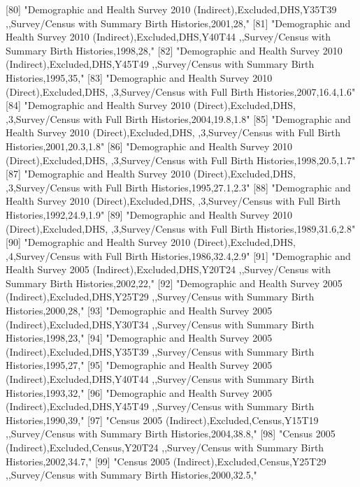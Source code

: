  [80] "Demographic and Health Survey 2010 (Indirect),Excluded,DHS,Y35T39 ,,Survey/Census with Summary Birth Histories,2001,28,"      
 [81] "Demographic and Health Survey 2010 (Indirect),Excluded,DHS,Y40T44 ,,Survey/Census with Summary Birth Histories,1998,28,"      
 [82] "Demographic and Health Survey 2010 (Indirect),Excluded,DHS,Y45T49 ,,Survey/Census with Summary Birth Histories,1995,35,"      
 [83] "Demographic and Health Survey 2010 (Direct),Excluded,DHS, ,3,Survey/Census with Full Birth Histories,2007,16.4,1.6"           
 [84] "Demographic and Health Survey 2010 (Direct),Excluded,DHS, ,3,Survey/Census with Full Birth Histories,2004,19.8,1.8"           
 [85] "Demographic and Health Survey 2010 (Direct),Excluded,DHS, ,3,Survey/Census with Full Birth Histories,2001,20.3,1.8"           
 [86] "Demographic and Health Survey 2010 (Direct),Excluded,DHS, ,3,Survey/Census with Full Birth Histories,1998,20.5,1.7"           
 [87] "Demographic and Health Survey 2010 (Direct),Excluded,DHS, ,3,Survey/Census with Full Birth Histories,1995,27.1,2.3"           
 [88] "Demographic and Health Survey 2010 (Direct),Excluded,DHS, ,3,Survey/Census with Full Birth Histories,1992,24.9,1.9"           
 [89] "Demographic and Health Survey 2010 (Direct),Excluded,DHS, ,3,Survey/Census with Full Birth Histories,1989,31.6,2.8"           
 [90] "Demographic and Health Survey 2010 (Direct),Excluded,DHS, ,4,Survey/Census with Full Birth Histories,1986,32.4,2.9"           
 [91] "Demographic and Health Survey 2005 (Indirect),Excluded,DHS,Y20T24 ,,Survey/Census with Summary Birth Histories,2002,22,"      
 [92] "Demographic and Health Survey 2005 (Indirect),Excluded,DHS,Y25T29 ,,Survey/Census with Summary Birth Histories,2000,28,"      
 [93] "Demographic and Health Survey 2005 (Indirect),Excluded,DHS,Y30T34 ,,Survey/Census with Summary Birth Histories,1998,23,"      
 [94] "Demographic and Health Survey 2005 (Indirect),Excluded,DHS,Y35T39 ,,Survey/Census with Summary Birth Histories,1995,27,"      
 [95] "Demographic and Health Survey 2005 (Indirect),Excluded,DHS,Y40T44 ,,Survey/Census with Summary Birth Histories,1993,32,"      
 [96] "Demographic and Health Survey 2005 (Indirect),Excluded,DHS,Y45T49 ,,Survey/Census with Summary Birth Histories,1990,39,"      
 [97] "Census 2005 (Indirect),Excluded,Census,Y15T19 ,,Survey/Census with Summary Birth Histories,2004,38.8,"                        
 [98] "Census 2005 (Indirect),Excluded,Census,Y20T24 ,,Survey/Census with Summary Birth Histories,2002,34.7,"                        
 [99] "Census 2005 (Indirect),Excluded,Census,Y25T29 ,,Survey/Census with Summary Birth Histories,2000,32.5,"                        
